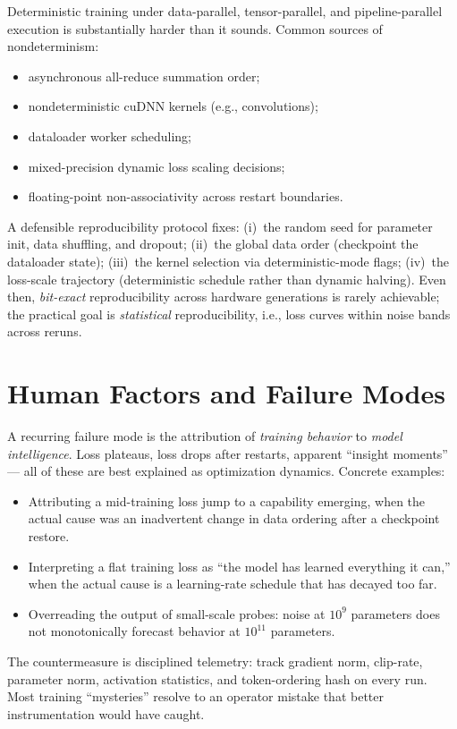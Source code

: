 Deterministic training under data-parallel, tensor-parallel, and
pipeline-parallel execution is substantially harder than it sounds.
Common sources of nondeterminism:
\begin{itemize}
  \item asynchronous all-reduce summation order;
  \item nondeterministic cuDNN kernels (e.g., convolutions);
  \item dataloader worker scheduling;
  \item mixed-precision dynamic loss scaling decisions;
  \item floating-point non-associativity across restart boundaries.
\end{itemize}
A defensible reproducibility protocol fixes:
(i)~the random seed for parameter init, data shuffling, and dropout;
(ii)~the global data order (checkpoint the dataloader state);
(iii)~the kernel selection via deterministic-mode flags;
(iv)~the loss-scale trajectory (deterministic schedule rather than
dynamic halving).
Even then, \emph{bit-exact} reproducibility across hardware generations
is rarely achievable; the practical goal is \emph{statistical}
reproducibility, i.e., loss curves within noise bands across reruns.

\section{Human Factors and Failure Modes}

A recurring failure mode is the attribution of \emph{training behavior}
to \emph{model intelligence}. Loss plateaus, loss drops after restarts,
apparent ``insight moments'' — all of these are best explained as
optimization dynamics. Concrete examples:
\begin{itemize}
  \item Attributing a mid-training loss jump to a capability emerging,
        when the actual cause was an inadvertent change in data
        ordering after a checkpoint restore.
  \item Interpreting a flat training loss as ``the model has learned
        everything it can,'' when the actual cause is a learning-rate
        schedule that has decayed too far.
  \item Overreading the output of small-scale probes: noise at
        $10^9$ parameters does not monotonically forecast behavior at
        $10^{11}$ parameters.
\end{itemize}
The countermeasure is disciplined telemetry: track gradient norm,
clip-rate, parameter norm, activation statistics, and token-ordering
hash on every run. Most training ``mysteries'' resolve to an operator
mistake that better instrumentation would have caught.

